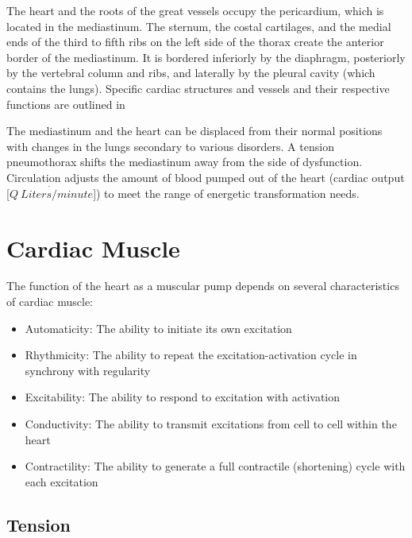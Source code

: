 
The heart and the roots of the great vessels occupy the pericardium, which is located in the mediastinum. The sternum, the costal cartilages, and the medial ends of the third to fifth ribs on the left side of the thorax create the anterior border of the mediastinum. It is bordered inferiorly by the diaphragm, posteriorly by the vertebral column and ribs, and laterally by the pleural cavity (which contains the lungs). Specific cardiac structures and vessels and their respective functions are outlined in 

The mediastinum and the heart can be displaced from their normal positions with changes in the lungs secondary to various disorders. A tension pneumothorax shifts the mediastinum away from the side of dysfunction.
Circulation adjusts the amount of blood pumped out of the heart (cardiac output [$\dot{Q \ Liters/minute}$]) to meet the range of energetic transformation needs.



\section{Cardiac Muscle}

The function of the heart as a muscular pump depends on several characteristics of cardiac muscle:

\begin{itemize}
    
    \item Automaticity: The ability to initiate its own excitation
    \item Rhythmicity: The ability to repeat the excitation-activation cycle in synchrony with regularity
    \item Excitability: The ability to respond to excitation with activation
    \item Conductivity: The ability to transmit excitations from cell to cell within the heart
    \item Contractility: The ability to generate a full contractile (shortening) cycle with each excitation
 
\end{itemize}


\subsection{Tension}

